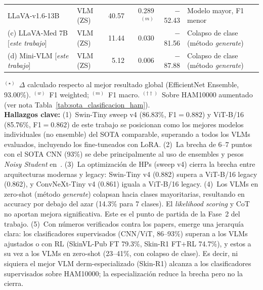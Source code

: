 \begin{table}[htbp]
{\begin{tabular}{@{}llrrrl@{}}
\cite{SkinR12025} LLaVA-v1.6-13B
  & VLM (ZS) & 40.57 & 0.289$^{(m)}$ & $-$52.43 & Modelo mayor, F1 menor \\

\addlinespace[4pt]
\rowcolor{thiswork}
(c) LLaVA-Med 7B [\textit{este trabajo}]
  & VLM (ZS) & 11.44 & 0.030 & $-$81.56 & Colapso de clase (método \textit{generate}) \\

\rowcolor{thiswork}
(d) Mini-VLM [\textit{este trabajo}]
  & VLM (ZS) & 5.12 & 0.006 & $-$87.88 & Colapso de clase (método \textit{generate}) \\

\bottomrule
\end{tabular}%
}
\vspace{4pt}
\begin{minipage}{\textwidth}
  \footnotesize
  $^{(\star)}$~$\Delta$ calculado respecto al mejor resultado global
  (EfficientNet Ensemble, 93.00\%).
  $^{(w)}$~F1 weighted; $^{(m)}$~F1 macro.
  $^{(\dagger\dagger)}$~Sobre HAM10000 aumentado (ver nota Tabla~\ref{tab:sota_clasificacion_ham}).\\[4pt]
  \textbf{Hallazgos clave:}
  (1)~Swin-Tiny sweep v4 (86.83\%, F1${=}0.882$) y ViT-B/16 (85.76\%, F1${=}0.862$) de este
  trabajo se posicionan como los mejores modelos individuales (no ensemble) del SOTA
  comparable, superando a todos los VLMs evaluados, incluyendo los fine-tuneados con LoRA.
  (2)~La brecha de 6--7 puntos con el SOTA CNN (93\%) se debe principalmente
  al uso de ensembles y pesos \textit{Noisy Student} en~\cite{SkinHealthMate2024}.
  (3)~La optimización de HPs (sweep v4) cierra la brecha entre arquitecturas modernas y
  legacy: Swin-Tiny v4 (0.882) supera a ViT-B/16 legacy (0.862), y ConvNeXt-Tiny v4 (0.861)
  iguala a ViT-B/16 legacy.
  (4)~Los VLMs en zero-shot (método \textit{generate}) colapsan hacia clases
  mayoritarias, resultando en accuracy por debajo del azar (14.3\% para 7 clases).
  El \textit{likelihood scoring} y CoT no aportan mejora significativa.
  Este es el punto de partida de la Fase~2 del trabajo.
  (5)~Con números verificados contra los papers, emerge una jerarquía clara: los
  clasificadores supervisados (CNN/ViT, 86--93\%) superan a los VLMs ajustados o con RL
  (SkinVL-Pub FT 79.3\%, Skin-R1 FT$+$RL 74.7\%), y estos a su vez a los VLMs en zero-shot
  (23--41\%, con colapso de clase). Es decir, ni siquiera el mejor VLM derm-especializado
  (Skin-R1) alcanza a los clasificadores supervisados sobre HAM10000; la especialización
  reduce la brecha pero no la cierra.
\end{minipage}
\end{table}
